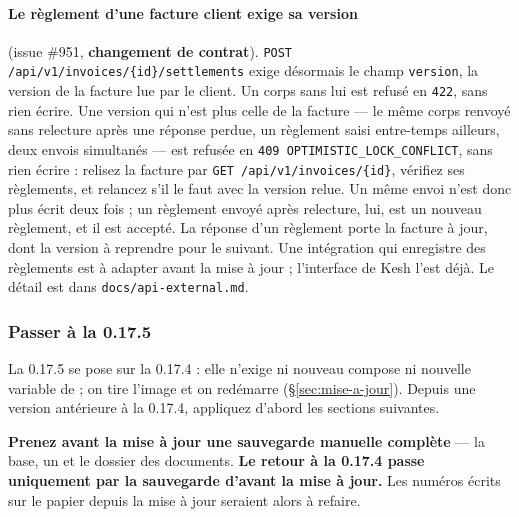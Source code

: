 \documentclass[a4paper,11pt,oneside]{article}
\begin{document}
\begin{sloppypar}
\paragraph{Le règlement d'une facture client exige sa version} (issue \#951, \textbf{changement de contrat}). \texttt{POST /api/v1/invoices/\{id\}/settlements} exige désormais le champ \texttt{version}, la version de la facture lue par le client. Un corps sans lui est refusé en \texttt{422}, sans rien écrire. Une version qui n'est plus celle de la facture --- le même corps renvoyé sans relecture après une réponse perdue, un règlement saisi entre-temps ailleurs, deux envois simultanés --- est refusée en \texttt{409 OPTIMISTIC\_LOCK\_CONFLICT}, sans rien écrire : relisez la facture par \texttt{GET /api/v1/invoices/\{id\}}, vérifiez ses règlements, et relancez s'il le faut avec la version relue. Un même envoi n'est donc plus écrit deux fois ; un règlement envoyé après relecture, lui, est un nouveau règlement, et il est accepté. La réponse d'un règlement porte la facture à jour, dont la version à reprendre pour le suivant. Une intégration qui enregistre des règlements est à adapter avant la mise à jour ; l'interface de Kesh l'est déjà. Le détail est dans \texttt{docs/api-external.md}.
\end{sloppypar}

\fussy

\subsubsection{Passer à la 0.17.5}\label{sec:maj-0-17-5}

La 0.17.5 se pose sur la 0.17.4 : elle n'exige ni nouveau compose ni nouvelle variable de  ; on tire l'image et on redémarre (\S\ref{sec:mise-a-jour}). Depuis une version antérieure à la 0.17.4, appliquez d'abord les sections suivantes.

\begin{keshwarning}
\textbf{Prenez avant la mise à jour une sauvegarde manuelle complète} --- la base, un  et le dossier des documents. \textbf{Le retour à la 0.17.4 passe uniquement par la sauvegarde d'avant la mise à jour.} Les numéros écrits sur le papier depuis la mise à jour seraient alors à refaire.
\end{keshwarning}
\end{document}
